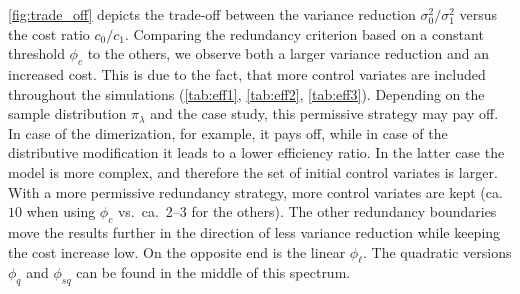 \autoref{fig:trade_off} depicts the trade-off between the variance
reduction $\sigma_0^2/\sigma_1^2$
versus the cost ratio $c_0/c_1$. Comparing the redundancy criterion
based on a constant threshold
$\phi_c$ to the others,
we observe both a larger variance reduction and an increased cost.
This is due to the fact, that
more control  variates are included throughout the simulations
(\autoref{tab:eff1}, \autoref{tab:eff2}, \autoref{tab:eff3}).
Depending on the sample distribution $\pi_{\lambda}$
and the case study, this permissive strategy may pay off. In case of
the dimerization, for example,
it pays off, while in case of the distributive modification it leads
to a lower efficiency ratio.
In the latter case the model is more complex, and therefore the set of initial
control  variates is larger. With a more permissive redundancy
strategy, more control  variates are kept
(ca.\ $10$ when using $\phi_c$ vs.\ ca.\ \numrange{2}{3} for the others).
The other redundancy boundaries move the results further in the
direction of less variance reduction
while keeping the cost increase low.
On the opposite end is the linear $\phi_{\ell}$.
The quadratic versions $\phi_{q}$ and $\phi_{\mathit{sq}}$ can be
found in the middle of this spectrum.
